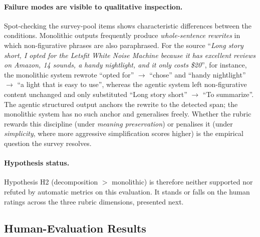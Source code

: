 \paragraph{Failure modes are visible to qualitative inspection.} Spot-checking the survey-pool items shows characteristic differences between the conditions. Monolithic outputs frequently produce \emph{whole-sentence rewrites} in which non-figurative phrases are also paraphrased. For the source ``\textit{Long story short, I opted for the Letsfit White Noise Machine because it has excellent reviews on Amazon, 14 sounds, a handy nightlight, and it only costs \$20}'', for instance, the monolithic system rewrote ``opted for'' $\to$ ``chose'' and ``handy nightlight'' $\to$ ``a light that is easy to use'', whereas the agentic system left non-figurative content unchanged and only substituted ``Long story short'' $\to$ ``To summarize''. The agentic structured output anchors the rewrite to the detected span; the monolithic system has no such anchor and generalises freely. Whether the rubric rewards this discipline (under \emph{meaning preservation}) or penalises it (under \emph{simplicity}, where more aggressive simplification scores higher) is the empirical question the survey resolves.

\paragraph{Hypothesis status.} Hypothesis H2 (decomposition $>$ monolithic) is therefore neither supported nor refuted by automatic metrics on this evaluation. It stands or falls on the human ratings across the three rubric dimensions, presented next.

\subsection{Human-Evaluation Results}
\label{subsec:rq2-human-eval-results}


